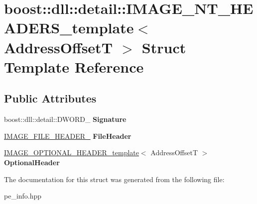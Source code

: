 \hypertarget{a01616}{}\section{boost\+:\+:dll\+:\+:detail\+:\+:I\+M\+A\+G\+E\+\_\+\+N\+T\+\_\+\+H\+E\+A\+D\+E\+R\+S\+\_\+template$<$ Address\+OffsetT $>$ Struct Template Reference}
\label{a01616}
\subsection*{Public Attributes}
\begin{DoxyCompactItemize}
\item 
\mbox{\label{a01616_ac62094a288f7e0758fd819727d23d86a}} 
boost\+::dll\+::detail\+::\+D\+W\+O\+R\+D\+\_\+ {\bfseries Signature}
\item 
\mbox{\label{a01616_af79e113f2e6d6dfc51c8310417334b38}} 
\hyperlink{a01588}{I\+M\+A\+G\+E\+\_\+\+F\+I\+L\+E\+\_\+\+H\+E\+A\+D\+E\+R\+\_\+} {\bfseries File\+Header}
\item 
\mbox{\label{a01616_a11d7a5f9756d15ce28dd47805a89ad0d}} 
\hyperlink{a01608}{I\+M\+A\+G\+E\+\_\+\+O\+P\+T\+I\+O\+N\+A\+L\+\_\+\+H\+E\+A\+D\+E\+R\+\_\+template}$<$ Address\+OffsetT $>$ {\bfseries Optional\+Header}
\end{DoxyCompactItemize}


The documentation for this struct was generated from the following file\+:\begin{DoxyCompactItemize}
\item 
pe\+\_\+info.\+hpp\end{DoxyCompactItemize}
